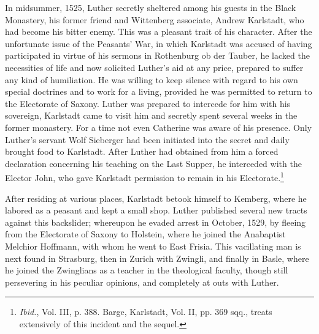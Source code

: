 In midsummer, 1525, Luther secretly sheltered among his guests
in the Black Monastery, his former friend and Wittenberg associate,
Andrew Karlstadt, who had become his bitter enemy. This was a
pleasant trait of his character. After the unfortunate issue of the
Peasants’ War, in which Karlstadt was accused of having participated
in virtue of his sermons in Rothenburg ob der Tauber, he lacked the
necessities of life and now solicited Luther’s aid at any price, prepared
to suffer any kind of humiliation. He was willing to keep
silence with regard to his own special doctrines and to work for
a living, provided he was permitted to return to the Electorate of
Saxony. Luther was prepared to intercede for him with his sovereign,
Karlstadt came to visit him and secretly spent several weeks in the
former monastery. For a time not even Catherine was aware of
his presence. Only Luther’s servant Wolf Sieberger had been initiated
into the secret and daily brought food to Karlstadt. After Luther
had obtained from him a forced declaration concerning his teaching
on the Last Supper, he interceded with the Elector John, who gave
Karlstadt permission to remain in his Electorate.\footnote
{\textit{Ibid.}, Vol. III, p. 388. Barge, Karlstadt, Vol. II, pp. 369 sqq., treats extensively of this
incident and the sequel.}

After residing at various places, Karlstadt betook himself to
Kemberg, where he labored as a peasant and kept a small shop. Luther
published several new tracts against this backslider; whereupon he
evaded arrest in October, 1529, by fleeing from the Electorate of
Saxony to Holstein, where he joined the Anabaptist Melchior Hoffmann,
with whom he went to East Frisia. This vacillating man is
next found in Strasburg, then in Zurich with Zwingli, and finally
in Basle, where he joined the Zwinglians as a teacher in the theological
faculty, though still persevering in his peculiar opinions, and completely
at outs with Luther.
